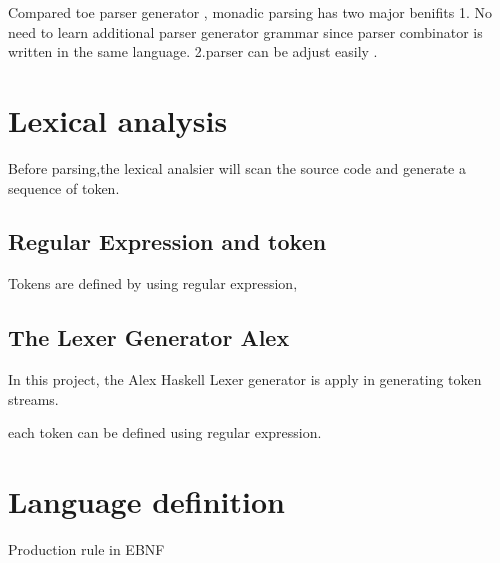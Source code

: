 Compared toe parser generator , monadic parsing has two major benifits
1. No need to learn additional parser generator grammar since parser combinator is written in the same language. 2.parser can be adjust easily .






\section {Lexical analysis}
Before parsing,the lexical analsier will scan the source code and generate a sequence of token.


\subsection{Regular Expression and token}
Tokens are defined by using regular expression,

\subsection{The Lexer Generator Alex}
In this project, the Alex Haskell Lexer generator is apply in generating token streams.

each token can be defined using regular expression.



\section{Language definition}

Production rule in EBNF 


